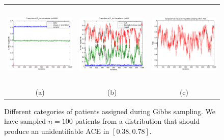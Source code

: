 \documentclass[a4paper, 10pt]{article}
\begin{document}
\begin{figure}
\begin{tabular}{ccc}
 \includegraphics[width=4.5cm,height=4cm,bb=103 240 500
555]{takingtype_case0.38_0.78_n=10000.eps} &
 \includegraphics[width=4.5cm,height=4cm,bb=103 240 500 555]
{healingtype_case0.38_0.78_n=100.eps} &
 \includegraphics[width=4.5cm,height=4cm,bb=103 240
500 555]{sampledACEs_case0.38_0.78_n=100.eps} \\
(a) & (b) & (c)
\end{tabular}
\caption{Different categories of patients assigned during Gibbs sampling. We
have sampled $n=100$ patients from a distribution that should produce an
unidentifiable ACE in $[0.38, 0.78]$.}
\label{fig:n=100_case0.38_0.78}
\end{figure}
\end{document}
